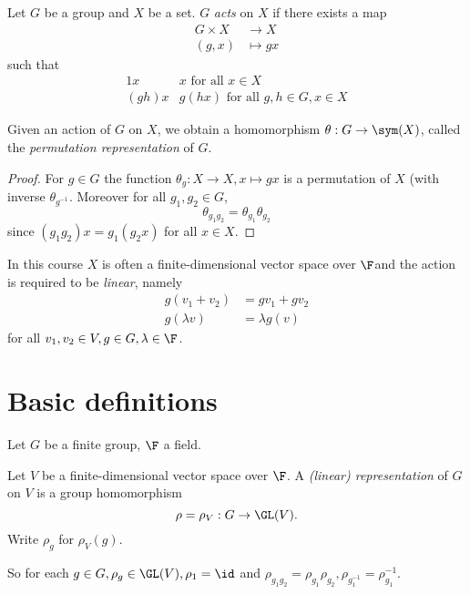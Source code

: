 \documentclass[a4paper]{article}
\begin{document}
\begin{definition}
  Let \(G\) be a group and \(X\) be a set. \(G\) \emph{acts} on \(X\) if there exists a map
  \begin{align*}
    G \times X &\to X \\
    (g, x) &\mapsto gx
  \end{align*}
  such that
  \begin{align*}
    1x & x \text{ for all } x \in X \\
    (gh) x & g (hx) \text{ for all } g, h \in G, x \in X
  \end{align*}
\end{definition}

\begin{proposition}
  Given an action of \(G\) on \(X\), we obtain a homomorphism \(\theta: G \to \sym(X)\), called the \emph{permutation representation} of \(G\).
\end{proposition}

\begin{proof}
  For \(g \in G\) the function \(\theta_g: X \to X, x \mapsto gx\) is a permutation of \(X\) (with inverse \(\theta_{g^{-1}}\). Moreover for all \(g_1, g_2 \in G\),
  \[
    \theta_{g_1 g_2} = \theta_{g_1} \theta_{g_2}
  \]
  since \((g_1g_2)x = g_1(g_2x)\) for all \(x \in X\).
\end{proof}

In this course \(X\) is often a finite-dimensional vector space over \(\F\)and the action is required to be \emph{linear}, namely
\begin{align*}
  g(v_1 + v_2) &= gv_1 + gv_2 \\
  g(\lambda v) &= \lambda g(v)
\end{align*}
for all \(v_1, v_2 \in V, g \in G, \lambda \in \F\).

\section{Basic definitions}

Let \(G\) be a finite group, \(\F\) a field.

\begin{definition}[representation]
  Let \(V\) be a finite-dimensional vector space over \(\F\). A \emph{(linear) representation} of \(G\) on \(V\) is a group homomorphism
  \[
    \rho = \rho_V: G \to \GL(V).
  \]
  Write \(\rho_g\) for \(\rho_V(g)\).
\end{definition}
So for each \(g \in G, \rho_g \in \GL(V), \rho_1 = \id\) and \(\rho_{g_1g_2} = \rho_{g_1}\rho_{g_2}, \rho_{g_1^{-1}} = \rho_{g_1}^{-1}\).
\end{document}
